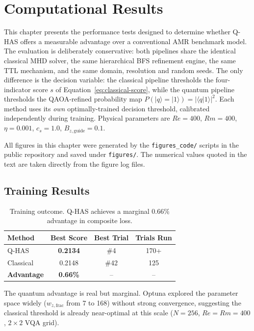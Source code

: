 \documentclass[12pt, a4paper, oneside]{report}
\begin{document}
\chapter{Computational Results}
\label{chap:results}


This chapter presents the performance tests designed to determine whether Q-HAS offers a measurable advantage over a conventional AMR benchmark model. The evaluation is deliberately conservative: both pipelines share the identical classical MHD solver, the same hierarchical BFS refinement engine, the same TTL mechanism, and the same domain, resolution and random seeds. The only difference is the decision variable: the classical pipeline thresholds the four-indicator score $s$ of Equation~\ref{eq:classical-score}, while the quantum pipeline thresholds the QAOA-refined probability map $P(|q\rangle = |1\rangle)=|\langle q|1\rangle|^2$. Each method uses its \textit{own} optimally-trained decision threshold, calibrated independently during training. Physical parameters are $Re = 400$, $Rm = 400$, $\eta = 0.001$, $c_s = 1.0$, $B_{z,\text{guide}} = 0.1$.

All figures in this chapter were generated by the \texttt{figures\_code/} scripts in the public repository and saved under \texttt{figures/}. The numerical values quoted in the text are taken directly from the figure log files.

\section{Training Results}
\label{sec:training-results}

\begin{table}[H]
\centering
\caption{Training outcome. Q-HAS achieves a marginal 0.66\% advantage in composite loss.}
\label{tab:training-outcome}
\begin{tabular}{lccc}
\toprule
\textbf{Method} & \textbf{Best Score} & \textbf{Best Trial} & \textbf{Trials Run} \\
\midrule
Q-HAS     & \textbf{0.2134} & \#4  & 170+ \\
Classical & 0.2148          & \#42 & 125 \\
\midrule
\textbf{Advantage} & \textbf{0.66\%} & -- & -- \\
\bottomrule
\end{tabular}
\end{table}

The quantum advantage is real but marginal. Optuna explored the parameter space widely ($w_{z,\text{frac}}$ from 7 to 168) without strong convergence, suggesting the classical threshold is already near-optimal at this scale ($N = 256$, $Re = Rm = 400$, $2\times 2$ VQA grid).
\end{document}
